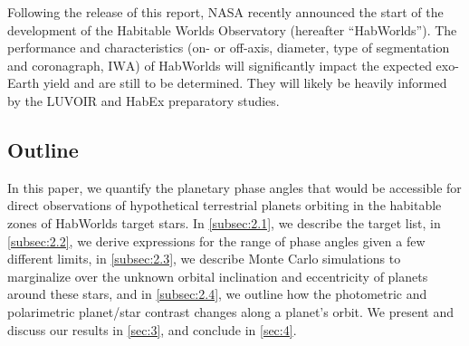 \documentclass[usenatbib]{mnras}
\newcommand{\IWA}{\ensuremath{\mathrm{IWA}}\xspace}
\newcommand{\HWO}{HabWorlds\xspace}
\begin{document}
%
Following the release of this report, NASA recently announced the start of the development of the Habitable Worlds Observatory (hereafter ``\HWO'').
%
The performance and characteristics (on- or off-axis, diameter, type of segmentation and coronagraph, \IWA) of \HWO will significantly 
impact the expected exo-Earth yield 
\citep{Stark2019_exoplanetyield}
and are still to be determined.
%
They will likely be heavily informed by the LUVOIR \citep{LUVOIR2019} and HabEx \citep{HabEx_2020} preparatory studies.
%



\subsection{Outline}

In this paper, we quantify the planetary phase angles that would be accessible for direct observations of hypothetical terrestrial planets orbiting in the habitable zones of \HWO target stars.
%
In \cref{subsec:2.1}, we describe the target list, in \cref{subsec:2.2}, we derive expressions for the range of phase angles given a few different limits, in \cref{subsec:2.3}, we describe Monte Carlo simulations to marginalize over the unknown orbital inclination and eccentricity of planets around these stars, and in \cref{subsec:2.4}, we outline how the photometric and polarimetric planet/star contrast changes along a planet's orbit.  
%
We present and discuss our results in \cref{sec:3}, and conclude in \cref{sec:4}. 

\end{document}
